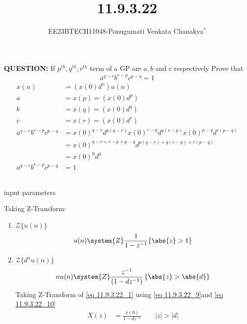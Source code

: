 \documentclass[journal,12pt,twocolumn]{IEEEtran}
\theoremstyle{remark}
\begin{document}
 
 \vspace{3cm}
 \title{\textbf{11.9.3.22}}
 \author{EE23BTECH11048-Ponugumati Venkata Chanakya$^{*}$%
 }
 \maketitle
 \newpage
 \bigskip
 \renewcommand{\thefigure}{\theenumi}
 \renewcommand{\thetable}{\theenumi}
 \textbf{QUESTION:}
If $p^{th},q^{th},r^{th} $ term of a GP are $a,b$ and $c$  respectively Prove that \\
\begin{align*}
    a^{q-r}b^{r-p}c^{p-q}=1
\end{align*}
\solution
\fi
\begin{align}
x(n)&=(x(0)d^n) u (n) \label{eq 11.9.3.22_1}\\
a&=x(p) = (x(0)d^p)\\
b&=x(q) = (x(0)d^q)\\
c&=x(r) = (x(0)d^r)\\
a^{q-r}b^{r-p}c^{p-q}&=x(0)^{q-r} d^{p(q-r)} x(0)^{r-p} d^{q(r-p)} x(0)^{p-q} d^{r(p-q)} \\
&= x(0)^{q-r+r-p+p-q} d^{p(q-r)+q(r-p)+r(p-q)}\\
&=x(0)^0 d^0\\
a^{q-r}b^{r-p}c^{p-q} &=1
\end{align}\

 \begin{table}[!ht]
    \centering
        
    \caption{input parameters}
    \label{tab:11_9_3_22}
\end{table}

Taking Z-Transform:
\begin{enumerate}
    \item $\mathcal{Z}\{u(n)\}$
\begin{align}
    u(n) \system{Z} \frac{1}{1-z^{-1}} \{\abs{z} > 1\}\label{eq 11.9.3.22_9} 
\end{align}
    \item $\mathcal{Z}\{d^{n}u(n)\}$ 
\begin{align}
    nu(n) \system{Z} \frac{z^{-1}}{(1-dz^{-1})}\, \{\abs{z} > \abs{d}\} \label{eq 11.9.3.22_10}
    \end{align}
    Taking Z-Transform of \eqref{eq 11.9.3.22_1} using \eqref{eq 11.9.3.22_9}and \eqref{eq 11.9.3.22_10}
    \begin{align}
    X(z) &= \frac{x(0)}{1-dz^{-1}} \qquad |z| > |d|
     \end{align}
\end{enumerate}
\end{document}
